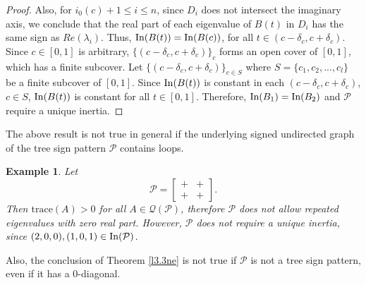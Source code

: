 \documentclass[a4paper, 10pt]{article}
\newtheorem{eg}{Example}[section]
\numberwithin{equation}{section}
\def\In{{\rm In}}
\begin{document}
\begin{proof}
		Also, for $i_0(c)+1\leq i\leq n$, since $D_i$ does not intersect the imaginary axis, we conclude that the real part of each eigenvalue of $B(t)$ in $D_i$ has the same sign as $Re(\lambda_i)$. Thus, $\In(B(t))=\In(B(c))$, for all $t\in(c-\delta_c,c+\delta_c)$. Since $c\in [0,1]$ is arbitrary, $\{(c-\delta_c,c+\delta_c)\}_c$ forms an open cover of $[0,1]$, which has a finite subcover. Let $\{(c-\delta_c,c+\delta_c)\}_{c\in S}$ where $S=\{c_1,c_2,...,c_l\}$ be a finite subcover of $[0,1]$. Since $\In(B(t))$ is constant in each $(c-\delta_c,c+\delta_c)$, $c\in S$, $\In(B(t))$ is constant for all $t\in [0,1]$. Therefore, $\In(B_1)=\In(B_2)$ and $\mathcal{P}$ require a unique inertia.
	\end{proof}
	The above result is not true in general if the underlying signed undirected graph of the tree sign pattern $\mathcal{P}$ contains loops.
	\begin{eg}
		Let $$\mathcal{P}=\begin{bmatrix}
			+&+\\+&+
		\end{bmatrix}.$$ Then $\text{trace}(A)>0$ for all $A\in \mathcal{Q}(\mathcal{P})$, therefore $\mathcal{P}$ does not allow repeated eigenvalues with zero real part. However, $\mathcal{P}$ does not require a unique inertia, since $(2,0,0),(1,0,1)\in \In(\mathcal{P})$.   
	\end{eg}
	Also, the conclusion of Theorem \ref{l3.3ne} is not true if $\mathcal{P}$ is not a tree sign pattern, even if it has a $0$-diagonal.
\end{document}

